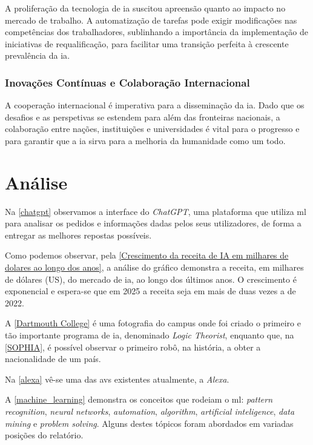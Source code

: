 \documentclass{report}
\begin{document}
	A proliferação da tecnologia de \ac{ia} suscitou apreensão quanto ao impacto no mercado de trabalho. A automatização de tarefas pode exigir modificações nas competências dos trabalhadores, sublinhando a importância da implementação de iniciativas de requalificação, para facilitar uma transição perfeita à crescente prevalência da \ac{ia}. \cite{emprego}

\subsection{Inovações Contínuas e Colaboração Internacional}
\label{subsec.inovacoes}

	A cooperação internacional é imperativa para a disseminação da \ac{ia}. Dado que os desafios e as perspetivas se estendem para além das fronteiras nacionais, a colaboração entre nações, instituições e universidades é vital para o progresso e para garantir que a \ac{ia} sirva para a melhoria da humanidade como um todo.

\chapter{Análise}
\label{chap.analise}

	Na \autoref{chatgpt} observamos a interface do \textit{ChatGPT}, uma plataforma que utiliza \ac{ml} para analisar os pedidos e informações dadas pelos seus utilizadores, de forma a entregar as melhores repostas possíveis.	
	
	Como podemos observar, pela \autoref{Crescimento da receita de IA em milhares de dolares ao longo dos anos}, a análise do gráfico demonstra a receita, em milhares de dólares (US), do mercado de \ac{ia}, ao longo dos últimos anos. O crescimento é exponencial e espera-se que em 2025 a receita seja em mais de duas vezes a de 2022.
	
	A \autoref{Dartmouth College} é uma fotografia do campus onde foi criado o primeiro e tão importante programa de \ac{ia}, denominado \textit{Logic Theorist}, enquanto que, na \autoref{SOPHIA}, é possível observar o primeiro robô, na história, a obter a nacionalidade de um país.
	
	Na \autoref{alexa} vê-se uma das \ac{avs} existentes atualmente, a \textit{Alexa}.
	
	A \autoref{machine_learning} demonstra os conceitos que rodeiam o \ac{ml}: \textit{pattern recognition}, \textit{neural networks}, \textit{automation}, \textit{algorithm}, \textit{artificial inteligence}, \textit{data mining} e \textit{problem solving}. Alguns destes tópicos foram abordados em variadas posições do relatório.
	
\end{document}
